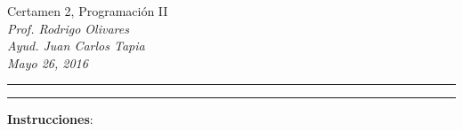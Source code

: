 \documentclass[10pt]{article}
\begin{document}
    \begin{center}
		{\Large Certamen 2, Programaci\'on II} \\
		\emph{\small Prof. Rodrigo Olivares} \\
		\emph{\small Ayud. Juan Carlos Tapia} \\
		\emph{\scriptsize Mayo 26, 2016} 
	\end{center}

	\vspace*{-35pt}
	\begin{center}
		\rule{1\textwidth}{.3pt}
	\end{center}
	\vspace*{-42pt}
	\begin{center}
		\rule{1\textwidth}{2pt}
	\end{center}

	\vspace*{-15pt}

	{\small \textbf{Instrucciones}:}

	\vspace*{-15pt}
\end{document}

